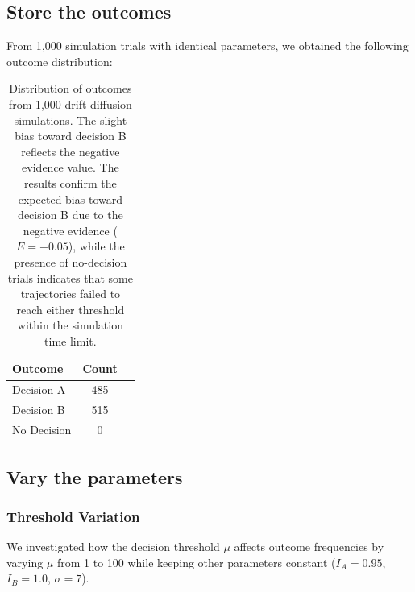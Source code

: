 \documentclass[11pt,a4paper]{article}
\begin{document}
\subsection{Store the outcomes}

From 1,000 simulation trials with identical parameters, we obtained the following outcome distribution:

\begin{table}[H]
    \centering
    \begin{tabular}{@{}lcc@{}}
        \toprule
        Outcome & Count  \\
        \midrule
        Decision A & 485  \\
        Decision B & 515 \\
        No Decision & 0 \\
        \bottomrule
    \end{tabular}
    \caption{Distribution of outcomes from 1,000 drift-diffusion simulations. The slight bias toward decision B reflects the negative evidence value. The results confirm the expected bias toward decision B due to the negative evidence ($E = -0.05$), while the presence of no-decision trials indicates that some trajectories failed to reach either threshold within the simulation time limit. }
    \label{tab:outcomes}
\end{table}


\subsection{Vary the parameters}

\subsubsection*{Threshold Variation}

We investigated how the decision threshold $\mu$ affects outcome frequencies by varying $\mu$ from 1 to 100 while keeping other parameters constant ($I_A = 0.95$, $I_B = 1.0$, $\sigma = 7$).
\end{document}
